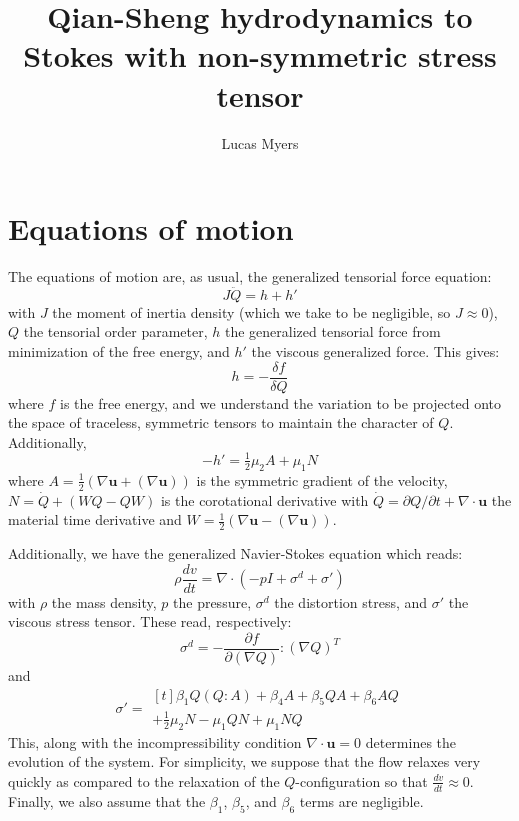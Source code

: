 \documentclass[reqno]{article}
\begin{document}
\title{Qian-Sheng hydrodynamics to Stokes with non-symmetric stress tensor}
\author{Lucas Myers}
\maketitle

\section{Equations of motion}
The equations of motion are, as usual, the generalized tensorial force equation:
\begin{equation}
  J \ddot{Q}
  =
  h + h'
\end{equation}
with $J$ the moment of inertia density (which we take to be negligible, so $J
\approx 0$), $Q$ the tensorial order parameter, $h$ the generalized tensorial force from
minimization of the free energy, and $h'$ the viscous generalized force.
This gives:
\begin{equation}
  h
  =
  -\frac{\delta f}{\delta Q}
\end{equation}
where $f$ is the free energy, and we understand the variation to be projected
onto the space of traceless, symmetric tensors to maintain the character of $Q$.
Additionally,
\begin{equation}
  -h'
  =
  \tfrac12 \mu_2 A
  + \mu_1 N
\end{equation}
where $A = \tfrac12 \left( \nabla \mathbf{u} + \left( \nabla
    \mathbf{u} \right) \right)$
is the symmetric gradient of the velocity, $N = \dot{Q} + \left(W Q - Q W
\right)$ is the corotational derivative with 
$\dot{Q} = \partial Q/\partial t + \nabla \cdot \mathbf{u}$ the material time
derivative and $W = \tfrac12 \left( \nabla \mathbf{u} - \left( \nabla \mathbf{u}
  \right) \right)$.

Additionally, we have the generalized Navier-Stokes equation which reads:
\begin{equation}
  \rho \frac{dv}{dt}
  =
  \nabla \cdot
  \left(
    -p I + \sigma^d + \sigma'
  \right)
\end{equation}
with $\rho$ the mass density, $p$ the pressure, $\sigma^d$ the distortion
stress, and $\sigma'$ the viscous stress tensor.
These read, respectively:
\begin{equation}
  \sigma^d
  =
  -\frac{\partial f}{\partial \left( \nabla Q \right)} : \left( \nabla Q \right)^T
\end{equation}
and
\begin{equation}
  \sigma'
  =
  \begin{multlined}[t]
    \beta_1 Q \left( Q : A \right)
    + \beta_4 A
    + \beta_5 QA
    + \beta_6 AQ \\
    + \tfrac12 \mu_2 N
    - \mu_1 QN
    + \mu_1 NQ
  \end{multlined}
\end{equation}
This, along with the incompressibility condition $\nabla \cdot \mathbf{u} = 0$
determines the evolution of the system.
For simplicity, we suppose that the flow relaxes very quickly as compared to the
relaxation of the $Q$-configuration so that $\frac{dv}{dt} \approx 0$.
Finally, we also assume that the $\beta_1$, $\beta_5$, and $\beta_6$ terms are
negligible.
\end{document}
